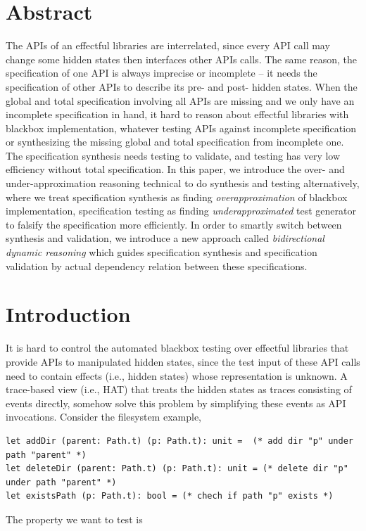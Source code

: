 \section{Abstract}

The APIs of an effectful libraries are interrelated, since every API call may change some hidden states then interfaces other APIs calls. The same reason, the specification of one API is always imprecise or incomplete -- it needs the specification of other APIs to describe its pre- and post- hidden states. When the global and total specification involving all APIs are missing and we only have an incomplete specification in hand, it hard to reason about effectful libraries with blackbox implementation, whatever testing APIs against incomplete specification or synthesizing the missing global and total specification from incomplete one. The specification synthesis needs testing to validate, and testing has very low efficiency without total specification.
In this paper, we introduce the over- and under-approximation reasoning technical to do synthesis and testing alternatively, where we treat specification synthesis as finding \emph{overapproximation} of blackbox implementation, specification testing as finding \emph{underapproximated} test generator to falsify the specification more efficiently. In order to smartly switch between synthesis and validation, we introduce a new approach called \emph{bidirectional dynamic reasoning} which guides specification synthesis and specification validation by actual dependency relation between these specifications.

\section{Introduction}

It is hard to control the automated blackbox testing over effectful libraries that provide APIs to manipulated hidden states, since the test input of these API calls need to contain effects (i.e., hidden states) whose representation is unknown. A trace-based view (i.e., HAT) that treats the hidden states as traces consisting of events directly, somehow solve this problem by simplifying these events as API invocations. Consider the filesystem example,
\begin{verbatim}
let addDir (parent: Path.t) (p: Path.t): unit =  (* add dir "p" under path "parent" *)
let deleteDir (parent: Path.t) (p: Path.t): unit = (* delete dir "p" under path "parent" *)
let existsPath (p: Path.t): bool = (* chech if path "p" exists *)
\end{verbatim}
\noindent
The property we want to test is\\

